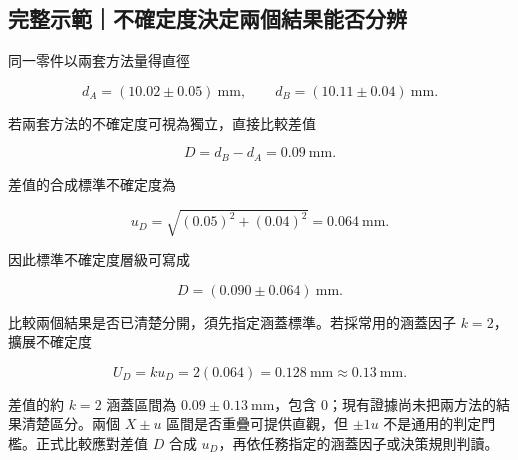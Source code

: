 \documentclass[11pt,a4paper]{article}
\begin{document}
\begin{HandoutWorkedExample}

\subsection{完整示範｜不確定度決定兩個結果能否分辨}\label{ux5b8cux6574ux793aux7bc4ux4e0dux78baux5b9aux5ea6ux6c7aux5b9aux5169ux500bux7d50ux679cux80fdux5426ux5206ux8fa8}

同一零件以兩套方法量得直徑

\[
d_A=(10.02\pm0.05)\ \mathrm{mm},\qquad
d_B=(10.11\pm0.04)\ \mathrm{mm}.
\]

若兩套方法的不確定度可視為獨立，直接比較差值

\[
D=d_B-d_A=0.09\ \mathrm{mm}.
\]

差值的合成標準不確定度為

\[
u_D=\sqrt{(0.05)^2+(0.04)^2}=0.064\ \mathrm{mm}.
\]

因此標準不確定度層級可寫成

\[
D=(0.090\pm0.064)\ \mathrm{mm}.
\]

比較兩個結果是否已清楚分開，須先指定涵蓋標準。若採常用的涵蓋因子 \(k=2\)，擴展不確定度

\[
U_D=ku_D=2(0.064)=0.128\ \mathrm{mm}\approx0.13\ \mathrm{mm}.
\]

差值的約 \(k=2\) 涵蓋區間為 \(0.09\pm0.13\ \mathrm{mm}\)，包含 0；現有證據尚未把兩方法的結果清楚區分。兩個 \(X\pm u\) 區間是否重疊可提供直觀，但 \(\pm1u\) 不是通用的判定門檻。正式比較應對差值 \(D\) 合成 \(u_D\)，再依任務指定的涵蓋因子或決策規則判讀。

\end{HandoutWorkedExample}
\end{document}
